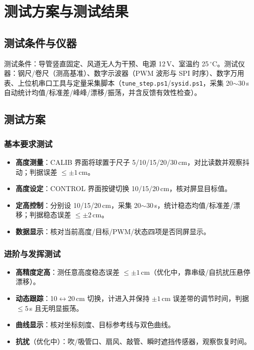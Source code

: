 \documentclass[12pt,a4paper]{ctexart}
\begin{document}
\section{测试方案与测试结果}

\subsection{测试条件与仪器}
测试条件：导管竖直固定、风道无人为干预、电源 12\,V、室温约 25\,$^{\circ}$C。测试仪器：钢尺/卷尺（测高基准）、数字示波器（PWM 波形与 SPI 时序）、数字万用表、上位机串口工具与定量采集脚本（\texttt{tune\_step.ps1}/\texttt{sysid.ps1}，采集 20$\sim$30\,s 自动统计均值/标准差/峰峰/漂移/振荡，并含反馈有效性检查）。

\subsection{测试方案}

\subsubsection{基本要求测试}
\begin{itemize}[leftmargin=2em,itemsep=2pt]
  \item \textbf{高度测量}：CALIB 界面将球置于尺子 5/10/15/20/30\,cm，对比读数并观察抖动；判据误差 $\le\pm1$\,cm。
  \item \textbf{高度设定}：CONTROL 界面按键切换 10/15/20\,cm，核对屏显目标值。
  \item \textbf{定高控制}：分别设 10/15/20\,cm，采集 20$\sim$30\,s，统计稳态均值/标准差/漂移；判据稳态误差 $\le\pm2$\,cm。
  \item \textbf{数据显示}：核对当前高度/目标/PWM/状态四项是否同屏显示。
\end{itemize}

\subsubsection{进阶与发挥测试}
\begin{itemize}[leftmargin=2em,itemsep=2pt]
  \item \textbf{高精度定高}：测任意高度稳态误差 $\le\pm1$\,cm（优化中，靠串级/自抗扰压悬停漂移）。
  \item \textbf{动态跟踪}：10$\leftrightarrow$20\,cm 切换，计进入并保持 $\pm1$\,cm 误差带的调节时间，判据 $\le5$\,s 且无明显振荡。
  \item \textbf{曲线显示}：核对坐标刻度、目标参考线与双色曲线。
  \item \textbf{抗扰}（优化中）：吹/吸管口、扇风、敲管、瞬时遮挡传感器，观察恢复时间。
\end{itemize}
\end{document}
